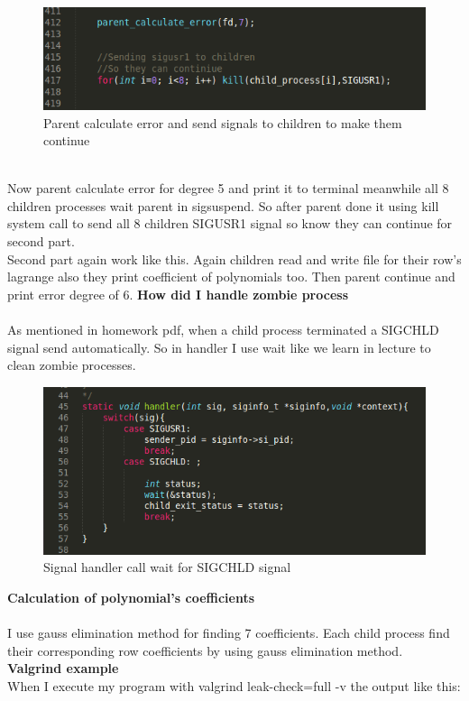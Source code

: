 \documentclass{article}
\begin{document}
\begin{figure}[h!]
\centering
\includegraphics[scale=0.6]{ss6.png}
\caption{Parent calculate error and send signals to children to make them continue}
\label{fig:ss5.png}
\end{figure}
\\
Now parent calculate error for degree 5 and print it to terminal meanwhile all 8 children processes wait parent in sigsuspend. So after parent done it using kill system call to send all 8 children SIGUSR1 signal so know they can continue for second part.
\\ 
Second part again work like this. Again children read and write file for their row's lagrange also they print coefficient of polynomials too. Then parent continue and print error degree of 6.
\newpage
\textbf{
How did I handle zombie process} \\
\\
As mentioned in homework pdf, when a child process terminated a SIGCHLD signal send automatically. So in handler I use wait like we learn in lecture to clean zombie processes.



\begin{figure}[h!]
\centering
\includegraphics[scale=0.6]{ss7.png}
\caption{Signal handler call wait for SIGCHLD signal}
\label{fig:ss5.png}
\end{figure}

\textbf{
Calculation of polynomial's coefficients} \\
\\
I use gauss elimination method for finding 7 coefficients. Each child process find their corresponding row coefficients by using gauss elimination method. 
\\
\newpage
\textbf{
Valgrind example} \\
When I execute my program with valgrind leak-check=full -v the output like this:
\end{document}
